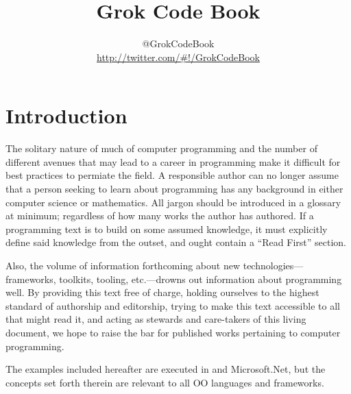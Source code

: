 \documentclass{book}
\title{Grok Code Book}
\author{@GrokCodeBook \\ \url{http://twitter.com/\#!/GrokCodeBook}}
\begin{document}
\maketitle
{}
\tableofcontents

\chapter*{Introduction}\normalsize
{}
\pagestyle{plain}

The solitary nature of much of computer programming and the number of different avenues that may lead to a career in programming make it 
difficult for best practices to permiate the field. A responsible author can no longer assume that a person seeking to learn about programming 
has any background in either computer science or mathematics. All jargon should be introduced in a glossary at minimum; regardless of how many 
works the author has authored. If a programming text is to build on some assumed knowledge, it must explicitly define said knowledge from the 
outset, and ought contain a ``Read First'' section. 

Also, the volume of information forthcoming about new technologies---frameworks, toolkits, tooling, etc.---drowns out information about programming 
well. By providing this text free of charge, holding ourselves to the highest standard of authorship and editorship, trying to make this text 
accessible to all that might read it, and acting as stewards and care-takers of this living document, we hope to raise the bar for published 
works pertaining to computer programming.

The examples included hereafter are executed in \CSharp and Microsoft.Net, but the concepts set forth therein are relevant to all OO languages and frameworks.

\pagestyle{headings}





\appendix




\printglossaries
\end{document}
